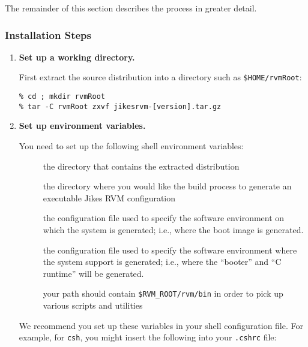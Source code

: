 The remainder of this section describes the process in greater detail.

\subsubsection{Installation Steps}
\label{sec:manual-classpath-root}

\begin{enumerate}
\item {\bf Set up a working directory.}

First extract the \jrvm{} source distribution into a
directory such as  
\texttt{\$HOME/rvmRoot}:
\begin{verbatim}
% cd ; mkdir rvmRoot
% tar -C rvmRoot zxvf jikesrvm-[version].tar.gz 
\end{verbatim}

%
\item {\bf Set up environment variables.}

You need to set up the following shell environment variables:

\begin{description}

\item[] the directory that contains
  the extracted distribution

\item[]
the directory where you would like the build
process to generate an executable Jikes RVM configuration

\item[]
the configuration file used to specify
the software environment on which the system is generated; i.e., where the
boot image is generated.  

\item[] the
configuration file used to specify the software environment where the
system support is generated; i.e., where the ``booter'' and ``C
runtime'' will be generated. 

\item[] your path should contain \texttt{\$RVM\_ROOT/\-rvm/\-bin} in
order to pick up various scripts and utilities

\end{description}

We recommend you set up these variables in your shell configuration
file.  For example, for \texttt{csh}, you might insert the
following into your \texttt{.cshrc} file:


\end{enumerate}
